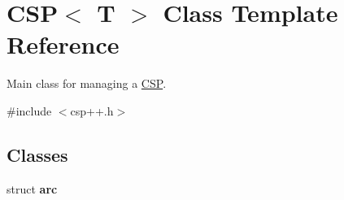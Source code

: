 \hypertarget{classCSP}{
\section{CSP$<$ T $>$ Class Template Reference}
\label{classCSP}
}


Main class for managing a \hyperlink{classCSP}{CSP}.  




{\ttfamily \#include $<$csp++.h$>$}

\subsection*{Classes}
\begin{DoxyCompactItemize}
\item 
struct {\bfseries arc}
\end{DoxyCompactItemize}
